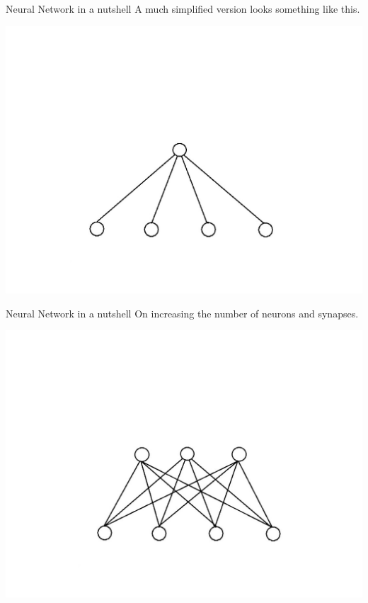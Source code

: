 \documentclass[10pt]{beamer}
\begin{document}
	\begin{frame}[c]{Neural Network in a nutshell}
		\large{A much simplified version looks something like this.}
		\begin{center}
			\includegraphics[width=0.9\linewidth]{images/sonn8}
		\end{center}
	\end{frame}
	\begin{frame}[c]{Neural Network in a nutshell}
		\large{On increasing the number of neurons and synapses.}
		\begin{center}
			\includegraphics[width=0.9\linewidth]{images/sonn9}
		\end{center}
	\end{frame}
\end{document}
